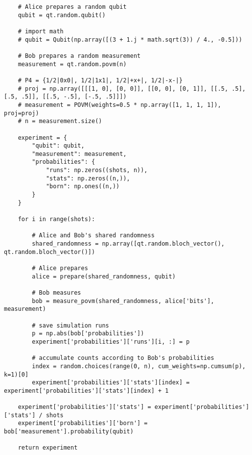 \begin{verbatim}
    # Alice prepares a random qubit
    qubit = qt.random.qubit()

    # import math
    # qubit = Qubit(np.array([(3 + 1.j * math.sqrt(3)) / 4., -0.5]))

    # Bob prepares a random measurement
    measurement = qt.random.povm(n)

    # P4 = {1/2|0x0|, 1/2|1x1|, 1/2|+x+|, 1/2|-x-|}
    # proj = np.array([[[1, 0], [0, 0]], [[0, 0], [0, 1]], [[.5, .5], [.5, .5]], [[.5, -.5], [-.5, .5]]])
    # measurement = POVM(weights=0.5 * np.array([1, 1, 1, 1]), proj=proj)
    # n = measurement.size()

    experiment = {
        "qubit": qubit,
        "measurement": measurement,
        "probabilities": {
            "runs": np.zeros((shots, n)),
            "stats": np.zeros((n,)),
            "born": np.ones((n,))
        }
    }

    for i in range(shots):

        # Alice and Bob's shared randomness
        shared_randomness = np.array([qt.random.bloch_vector(), qt.random.bloch_vector()])

        # Alice prepares
        alice = prepare(shared_randomness, qubit)

        # Bob measures
        bob = measure_povm(shared_randomness, alice['bits'], measurement)

        # save simulation runs
        p = np.abs(bob['probabilities'])
        experiment['probabilities']['runs'][i, :] = p

        # accumulate counts according to Bob's probabilities
        index = random.choices(range(0, n), cum_weights=np.cumsum(p), k=1)[0]
        experiment['probabilities']['stats'][index] = experiment['probabilities']['stats'][index] + 1

    experiment['probabilities']['stats'] = experiment['probabilities']['stats'] / shots
    experiment['probabilities']['born'] = bob['measurement'].probability(qubit)

    return experiment
\end{verbatim}
\newpage
